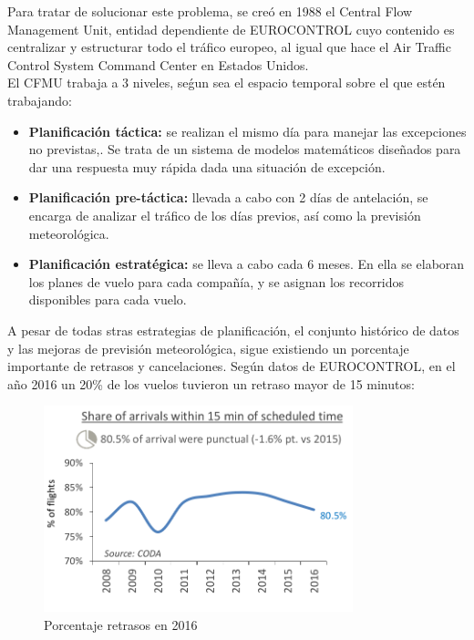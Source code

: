 Para tratar de solucionar este problema, se creó en 1988 el Central Flow Management Unit, entidad dependiente de EUROCONTROL cuyo contenido es centralizar y estructurar todo el tráfico europeo, al igual que hace el Air Traffic Control System Command Center en Estados Unidos.\\
El CFMU trabaja a 3 niveles, seǵun sea el espacio temporal sobre el que estén trabajando:
\begin{itemize}
	\item \textbf{Planificación táctica:} se realizan el mismo día para manejar las excepciones no previstas,. Se trata de un sistema de modelos matemáticos diseñados para dar una respuesta muy rápida dada una situación de excepción.
	\item \textbf{Planificación pre-táctica:} llevada a cabo con 2 días de antelación, se encarga de analizar el tráfico de los días previos, así como la previsión meteorológica.
	\item \textbf{Planificación estratégica: }se lleva a cabo cada 6 meses. En ella se elaboran los planes de vuelo para cada compañía, y se asignan los recorridos disponibles para cada vuelo.
\end{itemize}


	
A pesar de todas stras estrategias de planificación, el conjunto histórico de datos y las mejoras de previsión meteorológica, sigue existiendo un porcentaje importante de retrasos y cancelaciones. Según datos de EUROCONTROL, en el año 2016 un 20\% de los vuelos tuvieron un retraso mayor de 15 minutos:
\begin{figure}[H]
	\begin{center}
		\centering
		\includegraphics[width=0.8\textwidth]{./imagenes/introduccion/retrasos.png}
		\caption{Porcentaje retrasos en 2016}
		\label{fig: Porcentaje retrasos en 2016}
	\end{center}
\end{figure}


